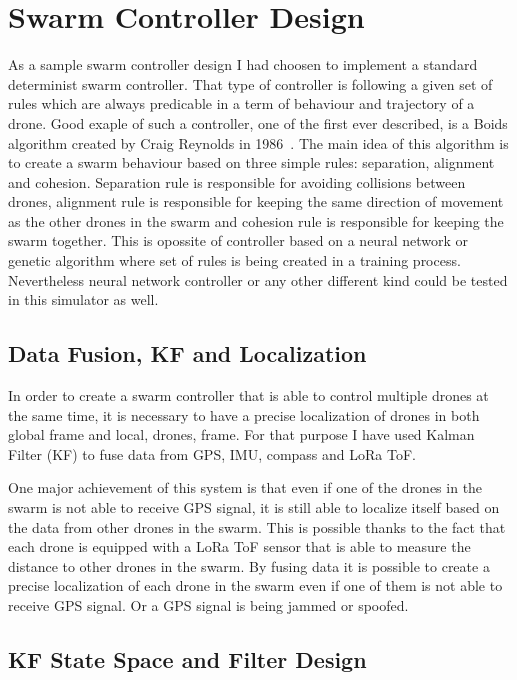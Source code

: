 \section{Swarm Controller Design}

As a sample swarm controller design I had choosen to implement a standard determinist swarm controller. That type of controller is following a given set of rules which are always predicable in a term of behaviour and trajectory of a drone. Good exaple of such a controller, one of the first ever described, is a Boids algorithm created by Craig Reynolds in 1986~\cite{wiki:boids}. The main idea of this algorithm is to create a swarm behaviour based on three simple rules: separation, alignment and cohesion. Separation rule is responsible for avoiding collisions between drones, alignment rule is responsible for keeping the same direction of movement as the other drones in the swarm and cohesion rule is responsible for keeping the swarm together.
 This is opossite of controller based on a neural network or genetic algorithm where set of rules is being created in a training process. Nevertheless neural network controller or any other different kind could be tested in this simulator as well. 




 \subsection{Data Fusion, KF and Localization}
    In order to create a swarm controller that is able to control multiple drones at the same time, it is necessary to have a precise localization of drones in both global frame and local, drones, frame. For that purpose I have used Kalman Filter (KF) to fuse data from GPS, IMU, compass and LoRa ToF. 

    One major achievement of this system is that even if one of the drones in the swarm is not able to receive GPS signal, it is still able to localize itself based on the data from other drones in the swarm. This is possible thanks to the fact that each drone is equipped with a LoRa ToF sensor that is able to measure the distance to other drones in the swarm. By fusing data it is possible to create a precise localization of each drone in the swarm even if one of them is not able to receive GPS signal. Or a GPS signal is being jammed or spoofed.



    \subsection{KF State Space and Filter Design}

